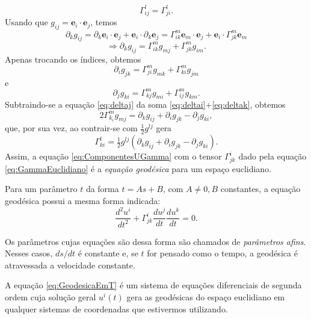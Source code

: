 \begin{equation}\label{eq:GammaSimetria}
\boxed{\Gamma_{i j}^{l}=\Gamma_{j i}^{l}} .
\end{equation}
Usando que $ g_{i j}=\mathbf{e}_{i} \cdot \mathbf{e}_{j} $, temos
\[
\partial_{k} g_{i j}=\partial_{k} \mathbf{e}_{i} \cdot \mathbf{e}_{j}+\mathbf{e}_{i} \cdot \partial_{k} \mathbf{e}_{j}=\Gamma_{i k}^{m} \mathbf{e}_{m} \cdot \mathbf{e}_{j}+\mathbf{e}_{i} \cdot \Gamma_{j k}^{m} \mathbf{e}_{m}
\]
\begin{equation}\label{eq:deltak}
\Rightarrow \partial_{k} g_{i j}=\Gamma_{i k}^{m} g_{m j}+\Gamma_{j k}^{m} g_{i m} .
\end{equation}
Apenas trocando os índices, obtemos
\begin{equation}\label{eq:deltai}
\partial_{i} g_{j k}=\Gamma_{j i}^{m} g_{m k}+\Gamma_{k i}^{m} g_{j m}
\end{equation}
e
\begin{equation}\label{eq:deltaj}
\partial_{j} g_{k i}=\Gamma_{k j}^{m} g_{m i}+\Gamma_{i j}^{m} g_{k m} .
\end{equation}
Subtraindo-se a equação \eqref{eq:deltaj} da soma \eqref{eq:deltai}+\eqref{eq:deltak}, obtemos
\[
	2 \Gamma_{k_{i}}^{m} g_{m j}=\partial_{k} g_{i j}+\partial_{i} g_{j k}-\partial_{j} g_{k i} ,
\]
que, por sua vez, ao contrair-se com $ \tfrac{1}{2} g^{l j} $ gera
\begin{equation}\label{eq:GammaEuclidiano}
\boxed{
	\Gamma_{k i}^{l}=\tfrac{1}{2} g^{l j}\left(\partial_{k} g_{i j}+\partial_{i} g_{j k}-\partial_{j} g_{k i}\right) .
} 
\end{equation}
Assim, a equação \eqref{eq:ComponentesUGamma} com o tensor $ \Gamma_{jk}^i $ dado pela equação \eqref{eq:GammaEuclidiano} é a \textit{equação geodésica} para um espaço euclidiano.

Para um parâmetro $ t $ da forma $ t = As+B $, com $ A\neq0,B $ constantes, a equação geodésica possui a mesma forma indicada:
\begin{equation}\label{eq:GeodesicaEmT}
\frac{d^{2} u^{i}}{d t^{2}}+\Gamma_{j k}^{i} \frac{d u^{j}}{d t} \frac{d u^{k}}{d t}=0 .
\end{equation}

Os parâmetros cujas equações são dessa forma são chamados de \textit{parâmetros afins}. Nesses casos, $ ds/dt $ é constante e, se $ t $ for pensado como o tempo, a geodésica é atravessada a velocidade constante.

A equação \eqref{eq:GeodesicaEmT} é um sistema de equações diferenciais de segunda ordem cuja solução geral $ u^i(t) $ gera as geodésicas do espaço euclidiano em qualquer sistemas de coordenadas que estivermos utilizando.

